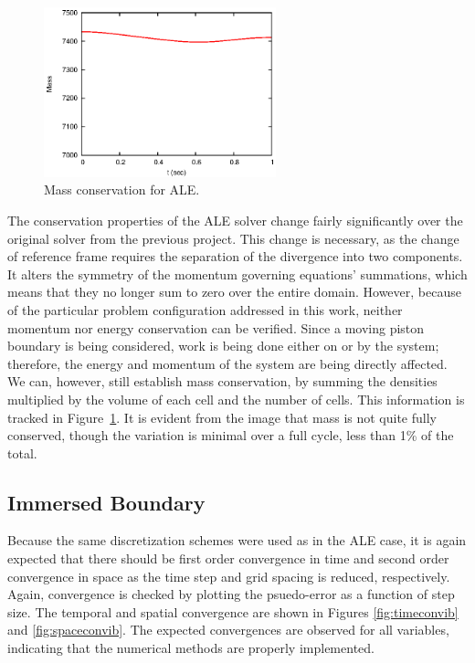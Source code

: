 \documentclass{article}
\begin{document}
\begin{figure}
  \centering
  \includegraphics[width=0.6\textwidth]{massconsALE.eps}         
  \caption{Mass conservation for ALE.}
  \label{fig:massconsALE}
\end{figure}
The conservation properties of the ALE solver change fairly significantly over the original solver from the previous project.  This change is necessary, as the change of reference frame requires the separation of the divergence into two components.  It alters the symmetry of the momentum governing equations' summations, which means that they no longer sum to zero over the entire domain.  However, because of the particular problem configuration addressed in this work, neither momentum nor energy conservation can be verified.  Since a moving piston boundary is being considered, work is being done either on or by the system; therefore, the energy and momentum of the system are being directly affected.  We can, however, still establish mass conservation, by summing the densities multiplied by the volume of each cell and the number of cells.  This information is tracked in Figure~\ref{fig:massconsALE}.  It is evident from the image that mass is not quite fully conserved, though the variation is minimal over a full cycle, less than 1\% of the total.  

\subsection{Immersed Boundary}

Because the same discretization schemes were used as in the ALE case, it is again expected that there should be first order convergence in time and second order convergence in space as the time step and grid spacing is reduced, respectively. Again, convergence is checked by plotting the psuedo-error as a function of step size. The temporal and spatial convergence are shown in Figures \ref{fig:timeconvib} and \ref{fig:spaceconvib}. The expected convergences are observed for all variables, indicating that the numerical methods are properly implemented. 
\end{document}
